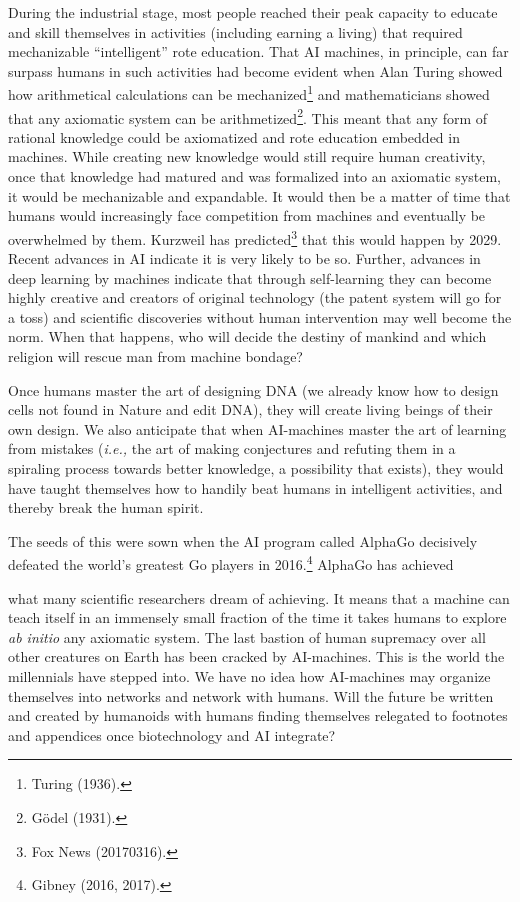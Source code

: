 \begin{multicols}{2}
\vskip -1pt

During the industrial stage, most people reached their peak capacity to educate and skill themselves in activities (including earning a living) that required mechanizable “intelligent” rote education. That AI machines, in principle, can far surpass humans in such activities had become evident when Alan Turing showed how arithmetical calculations can be mechanized\footnote{Turing (1936).}  and mathematicians showed that any axiomatic system can be arithmetized\footnote{Gödel (1931).}. This meant that any form of rational knowledge could be axiomatized and rote education embedded in machines. While creating new knowledge would still require human creativity, once that knowledge had matured and was formalized into an axiomatic system, it would be mechanizable and expandable. It would then be a matter of time that humans would increasingly face competition from machines and eventually be overwhelmed by them. Kurzweil has predicted\footnote{Fox News (20170316).}  that this would happen by 2029. Recent advances in AI indicate it is very likely to be so. Further, advances in deep learning by machines indicate that through self-learning they can become highly creative and creators of original technology (the patent system will go for a toss) and scientific discoveries without human intervention may well become the norm. When that happens, who will decide the destiny of mankind and which religion will rescue man from machine bondage?

\vskip -1pt

Once humans master the art of designing DNA (we already know how to design cells not found in Nature and edit DNA), they will create living beings of their own design. We also anticipate that when AI-machines master the art of learning from mistakes (\textit{i.e.,} the art of making conjectures and refuting them in a spiraling process towards better knowledge, a possibility that exists), they would have taught themselves how to handily beat humans in intelligent activities, and thereby break the human spirit.

\vskip -1pt

{\parfillskip=0pt
The seeds of this were sown when the AI program called AlphaGo decisively defeated the world's greatest Go players in 2016.\footnote{Gibney (2016, 2017).} AlphaGo has achieved\par}
\newpage

\noindent
what many scientific researchers dream of achieving. It means that a machine can teach itself in an immensely small fraction of the time it takes humans to explore \textit{ab initio} any axiomatic system. The last bastion of human supremacy over all other creatures on Earth has been cracked by AI-machines. This is the world the millennials have stepped into. We have no idea how AI-machines may organize themselves into networks and network with humans. Will the future be written and created by humanoids with humans finding themselves relegated to footnotes and appendices once biotechnology and AI integrate? 



\end{multicols}
